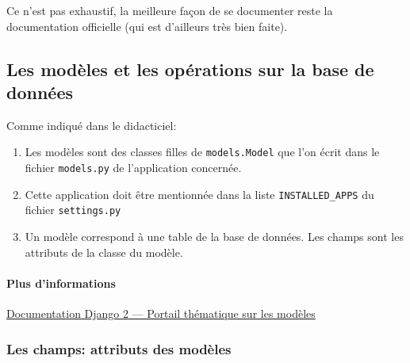 \documentclass[a4paper, 10pt]{article}
\begin{document}
Ce n'est pas exhaustif, la meilleure façon de se documenter reste la documentation officielle (qui est d'ailleurs très bien faite).

\subsection{Les modèles et les opérations sur la base de données}

Comme  indiqué dans le didacticiel:
\begin{enumerate}
    \item Les modèles sont des classes filles de \texttt{models.Model} que l'on écrit dans le fichier \texttt{models.py} de l'application concernée.
    \item Cette application doit être mentionnée dans la liste \texttt{INSTALLED\_APPS} du fichier \texttt{settings.py}
    \item Un modèle correspond à une table de la base de données. Les champs sont les attributs de la classe du modèle.
\end{enumerate}

\paragraph{Plus d'informations} \href{https://docs.djangoproject.com/fr/2.0/topics/db/}{Documentation Django 2 --- Portail thématique sur les modèles}

\subsubsection{Les champs: attributs des modèles}
\end{document}
